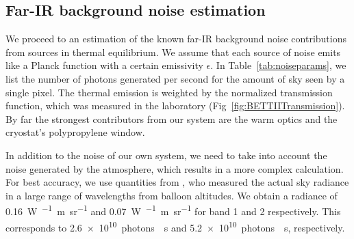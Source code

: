 \subsection{Far-IR background noise estimation}



We proceed to an estimation of the known far-IR background noise contributions from sources in thermal equilibrium. We assume that each source of noise emits like a Planck function \Bnu with a certain emissivity $\epsilon$. In Table~\ref{tab:noiseparams}, we list the number of photons generated per second for the amount of sky seen by a single pixel. The thermal emission is weighted by the normalized transmission function, which was measured in the laboratory (Fig~\ref{fig:BETTIITransmission}). By far the strongest contributors from our system are the warm optics and the cryostat's polypropylene window.
 

In addition to the noise of our own system, we need to take into account the noise generated by the atmosphere, which results in a more complex calculation. For best accuracy, we use quantities from \cite{Harries:1980cva}, who measured the actual sky radiance in a large range of wavelengths from balloon altitudes. We obtain a radiance of \SI{0.16}{\watt\per{}\meter\per\steradian} and \SI{0.07}{\watt\per{}\meter\per\steradian} for band 1 and 2 respectively. This corresponds to \num{2.6e10}~photons~\si{\per\second} and \num{5.2e10}~photons~\si{\per\second}, respectively. 

